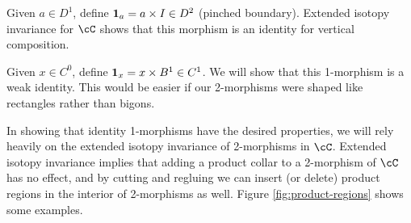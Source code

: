Given $a\in D^1$, define $\boldsymbol{1}_a = a\times I \in D^2$ (pinched boundary).
Extended isotopy invariance for $\cC$ shows that this morphism is an identity for 
vertical composition.

Given $x\in C^0$, define $\boldsymbol{1}_x = x\times B^1 \in C^1$.
We will show that this 1-morphism is a weak identity.
This would be easier if our 2-morphisms were shaped like rectangles rather than bigons.

In showing that identity 1-morphisms have the desired properties, we will
rely heavily on the extended isotopy invariance of 2-morphisms in $\cC$.
Extended isotopy invariance implies that adding a product collar to a 2-morphism of $\cC$ has no effect,
and by cutting and regluing we can insert (or delete) product regions in the interior of 2-morphisms as well.
Figure \ref{fig:product-regions} shows some examples.
